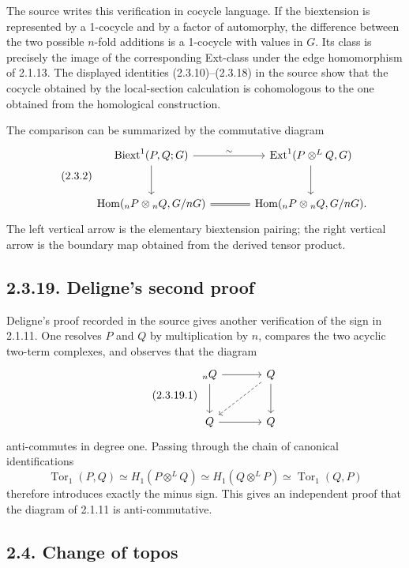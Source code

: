 \documentclass[11pt]{article}
\providecommand{\Tor}{\operatorname{Tor}}
\providecommand{\Hom}{\operatorname{Hom}}
\providecommand{\Ext}{\operatorname{Ext}}
\begin{document}
The source writes this verification in cocycle language.  If the biextension is represented by a 1-cocycle and by a factor of automorphy, the difference between the two possible \(n\)-fold additions is a 1-cocycle with values in \(G\).  Its class is precisely the image of the corresponding Ext-class under the edge homomorphism of 2.1.13.  The displayed identities (2.3.10)--(2.3.18) in the source show that the cocycle obtained by the local-section calculation is cohomologous to the one obtained from the homological construction.

The comparison can be summarized by the commutative diagram
\begin{equation}\tag{2.3.2}
\begin{tikzcd}[column sep=large,row sep=large]
\Biext^1(P,Q;G)\arrow[r,"\sim"]\arrow[d]&\Ext^1(P\otimes^LQ,G)\arrow[d]\\
\Hom({}_nP\otimes{}_nQ,G/nG)\arrow[r,equal]&\Hom({}_nP\otimes{}_nQ,G/nG).
\end{tikzcd}
\end{equation}
The left vertical arrow is the elementary biextension pairing; the right vertical arrow is the boundary map obtained from the derived tensor product.

\subsection*{2.3.19. Deligne's second proof}

Deligne's proof recorded in the source gives another verification of the sign in 2.1.11.  One resolves \(P\) and \(Q\) by multiplication by \(n\), compares the two acyclic two-term complexes, and observes that the diagram
\begin{equation}\tag{2.3.19.1}
\begin{tikzcd}[column sep=large,row sep=large]
{}_nQ\arrow[r]\arrow[d]&Q\arrow[d]\arrow[dl,dashed]\\
Q\arrow[r]&Q
\end{tikzcd}
\end{equation}
anti-commutes in degree one.  Passing through the chain of canonical identifications
\[
        \Tor_1(P,Q)\simeq H_1(P\otimes^LQ)
        \simeq H_1(Q\otimes^LP)
        \simeq \Tor_1(Q,P)
\]
therefore introduces exactly the minus sign.  This gives an independent proof that the diagram of 2.1.11 is anti-commutative.

\subsection*{2.4. Change of topos}
\end{document}
